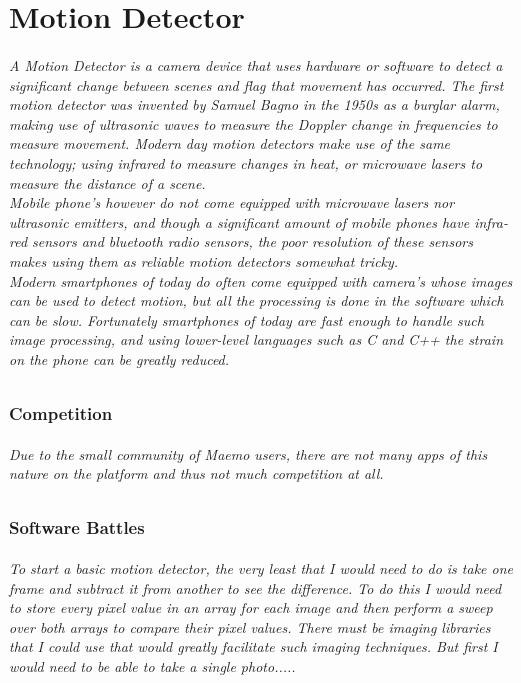 %



\part{Motion Detector}
\paragraph{A Motion Detector is a camera device that uses hardware or software to detect a significant change between scenes and flag that movement has occurred. The first motion detector was invented by Samuel Bagno in the 1950s as a burglar alarm, making use of ultrasonic waves to measure the Doppler change in frequencies to measure movement. Modern day motion detectors make use of the same technology; using infrared to measure changes in heat, or microwave lasers to measure the distance of a scene.\\
Mobile phone's however do not come equipped with microwave lasers nor ultrasonic emitters, and though a significant amount of mobile phones have infra-red sensors and bluetooth radio sensors, the poor resolution of these sensors makes using them as reliable motion detectors somewhat tricky.\\
Modern smartphones of today do often come equipped with camera's whose images can be used to detect motion, but all the processing is done in the software which can be slow. Fortunately smartphones of today are fast enough to handle such image processing, and using lower-level languages such as C and C++ the strain on the phone can be greatly reduced.}

\section{Competition}
\paragraph{Due to the small community of Maemo users, there are not many apps of this nature on the platform and thus not much competition at all.}

\section{Software Battles}
\paragraph{To start a basic motion detector, the very least that I would need to do is take one frame and subtract it from another to see the difference. To do this I would need to store every pixel value in an array for each image and then perform a sweep over both arrays to compare their pixel values. There must be imaging libraries that I could use that would greatly facilitate such imaging techniques. But first I would need to be able to take a single photo.....}


